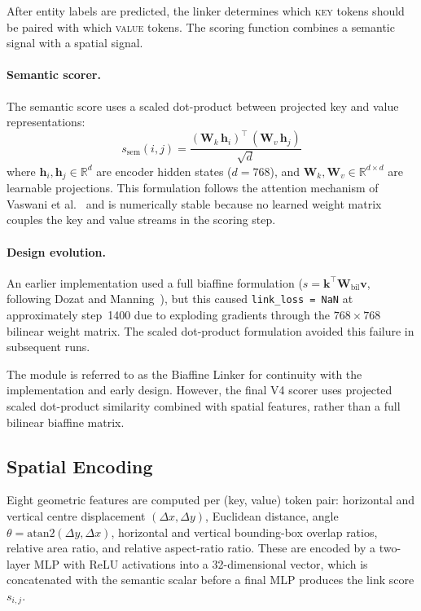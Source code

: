 After entity labels are predicted, the linker determines which \textsc{key}
tokens should be paired with which \textsc{value} tokens. The scoring function
combines a semantic signal with a spatial signal.

\paragraph{Semantic scorer.}
The semantic score uses a scaled dot-product between projected key and value
representations:
\[
  s_{\text{sem}}(i,j) = \frac{(\mathbf{W}_k\,\mathbf{h}_i)^\top\,
  (\mathbf{W}_v\,\mathbf{h}_j)}{\sqrt{d}}
\]
where $\mathbf{h}_i, \mathbf{h}_j \in \mathbb{R}^{d}$ are encoder hidden
states ($d = 768$), and $\mathbf{W}_k, \mathbf{W}_v \in \mathbb{R}^{d \times d}$
are learnable projections. This formulation follows the attention mechanism
of Vaswani et al.~\cite{vaswani2017attention} and is numerically stable
because no learned weight matrix couples the key and value streams in the
scoring step.

\paragraph{Design evolution.}
An earlier implementation used a full biaffine formulation
($s = \mathbf{k}^\top \mathbf{W}_{\text{bil}} \mathbf{v}$, following
Dozat and Manning~\cite{dozat2017biaffine}), but this caused
\texttt{link\_loss~=~NaN} at approximately step~1400 due to exploding
gradients through the $768 \times 768$ bilinear weight matrix. The scaled
dot-product formulation avoided this failure in subsequent runs.

The module is referred to as the Biaffine Linker for continuity with the
implementation and early design. However, the final V4 scorer uses projected
scaled dot-product similarity combined with spatial features, rather than a
full bilinear biaffine matrix.

\subsection{Spatial Encoding}
\label{sec:spatial-encoding}

Eight geometric features are computed per (key, value) token pair: horizontal
and vertical centre displacement $(\Delta x, \Delta y)$, Euclidean distance,
angle $\theta = \text{atan2}(\Delta y, \Delta x)$, horizontal and vertical
bounding-box overlap ratios, relative area ratio, and relative aspect-ratio
ratio. These are encoded by a two-layer MLP with ReLU activations into a
32-dimensional vector, which is concatenated with the semantic scalar before
a final MLP produces the link score $s_{i,j}$.


